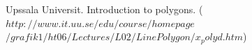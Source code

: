 \documentclass[12pt]{article}
\begin{document}
\begin{thebibliography}{99}

 Upssala Universit. Introduction to polygons. ($http://www.it.uu.se/edu/course/homepage$\\$/grafik1/ht06/Lectures/L02/LinePolygon/x_polyd.htm$)
\end{thebibliography}
\end{document}
